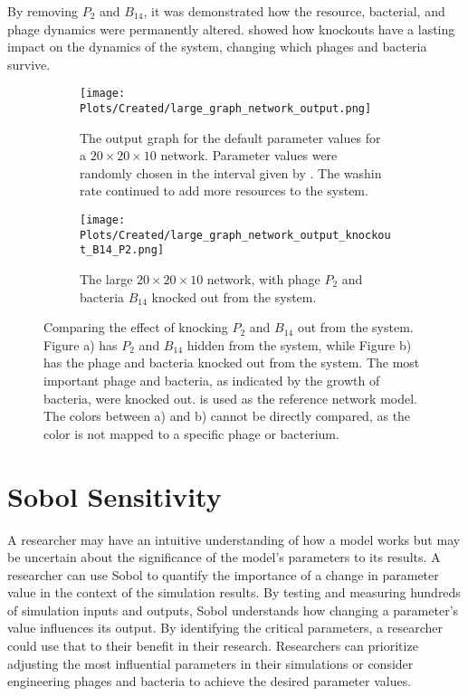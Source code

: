 By removing $P_2$ and $B_{14}$, it was demonstrated how the resource, bacterial, and phage dynamics were permanently altered. 
 showed how knockouts have a lasting impact on the dynamics of the system, changing which phages and bacteria survive. 

\begin{figure}
    \centering
    \begin{subfigure}{1\linewidth}
    \centering
    \texttt{[image: Plots/Created/large\_graph\_network\_output.png]}
    \caption{
        The output graph for the default parameter values for a $20\times 20 \times 10$ network. 
        Parameter values were randomly chosen in the interval given by . 
        The washin rate continued to add more resources to the system. 
    }
    \label{fig:created:large_graph_network_output}
    \end{subfigure}
    \hfill
    \begin{subfigure}{1\linewidth}
        \centering
        \texttt{[image: Plots/Created/large\_graph\_network\_output\_knockout\_B14\_P2.png]}
        \caption{
            The large $20\times 20\times 10$ network, with phage $P_2$ and bacteria $B_{14}$ knocked out from the system.
        }
        \label{fig:created:large_graph_network_output_knockout_B14_P2}
    \end{subfigure}
    \caption{
        Comparing the effect of knocking $P_2$ and $B_{14}$ out from the system. 
        Figure a) has $P_2$ and $B_{14}$ hidden from the system, while Figure b) has the phage and bacteria knocked out from the system. 
        The most important phage and bacteria, as indicated by the growth of bacteria, were knocked out. 
         is used as the reference network model. 
        The colors between a) and b) cannot be directly compared, as the color is not mapped to a specific phage or bacterium. 
    }
\end{figure}

\section{Sobol Sensitivity}
A researcher may have an intuitive understanding of how a model works but may be uncertain about the significance of the model’s parameters to its results.  
A researcher can use Sobol to quantify the importance of a change in parameter value in the context of the simulation results. 
By testing and measuring hundreds of simulation inputs and outputs, Sobol understands how changing a parameter’s value influences its output. 
By identifying the critical parameters, a researcher could use that to their benefit in their research. 
Researchers can prioritize adjusting the most influential parameters in their simulations or consider engineering phages and bacteria to achieve the desired parameter values.

